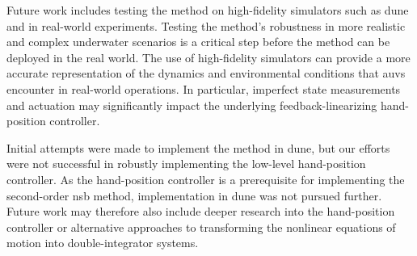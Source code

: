 Future work includes testing the method on high-fidelity simulators such as \gls{dune} \citep{dune} and in real-world experiments. Testing the method's robustness in more realistic and complex underwater scenarios is a critical step before the method can be deployed in the real world. The use of high-fidelity simulators can provide a more accurate representation of the dynamics and environmental conditions that \glspl{auv} encounter in real-world operations. In particular, imperfect state measurements and actuation may significantly impact the underlying feedback-linearizing hand-position controller. 

Initial attempts were made to implement the method in \gls{dune}, but our efforts were not successful in robustly implementing the low-level hand-position controller. As the hand-position controller is a prerequisite for implementing the second-order \gls{nsb} method, implementation in \gls{dune} was not pursued further. Future work may therefore also include deeper research into the hand-position controller or alternative approaches to transforming the nonlinear equations of motion into double-integrator systems.

